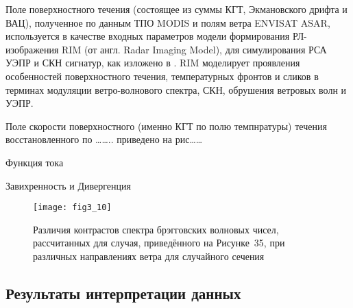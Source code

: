 {Поле поверхностного течения (состоящее из суммы КГТ, Экмановского дрифта и ВАЦ), полученное по данным ТПО MODIS и полям ветра ENVISAT ASAR, используется в качестве входных параметров модели формирования РЛ-изображения RIM (от англ. Radar Imaging Model), для симулирования РСА УЭПР и СКН сигнатур, как изложено в \citep{Kudryavtsev2005,Johannessen2005}. RIM моделирует проявления особенностей поверхностного течения, температурных фронтов и сликов в терминах модуляции ветро-волнового спектра, СКН, обрушения ветровых волн и УЭПР. 

Поле скорости поверхностного (именно КГТ по полю темпнратуры) течения восстановленного по \dots \dots .. приведено на рис\dots \dots 

Функция тока

Завихренность и Дивергенция



\begin{figure}[H]
    \texttt{[image: fig3\_10]}
    \caption{Различия контрастов спектра брэгговских волновых чисел, рассчитанных для случая, приведённого на Рисунке~35, при различных направлениях ветра для случайного сечения}
    \label{fig:3.10}
\end{figure}



\subsection{Результаты интерпретации данных} \label{sec:3.3.1}


}
